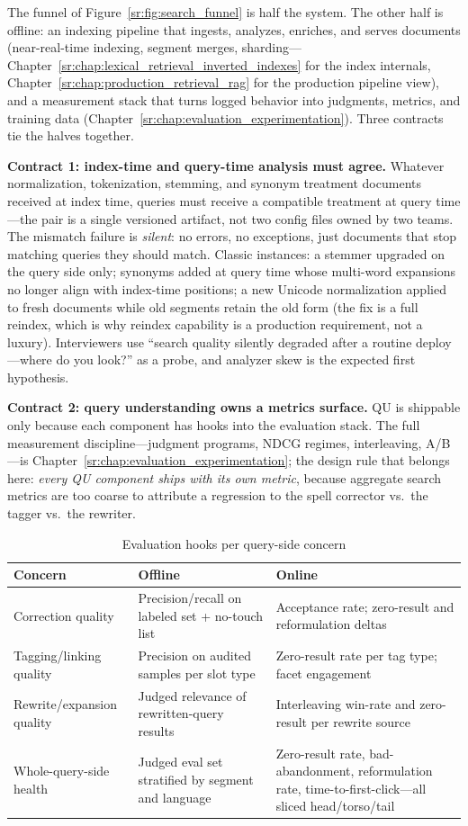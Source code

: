 The funnel of Figure~\ref{sr:fig:search_funnel} is half the system. The other half is offline: an indexing pipeline that ingests, analyzes, enriches, and serves documents (near-real-time indexing, segment merges, sharding---Chapter~\ref{sr:chap:lexical_retrieval_inverted_indexes} for the index internals, Chapter~\ref{sr:chap:production_retrieval_rag} for the production pipeline view), and a measurement stack that turns logged behavior into judgments, metrics, and training data (Chapter~\ref{sr:chap:evaluation_experimentation}). Three contracts tie the halves together.

\textbf{Contract 1: index-time and query-time analysis must agree.} Whatever normalization, tokenization, stemming, and synonym treatment documents received at index time, queries must receive a compatible treatment at query time---the pair is a single versioned artifact, not two config files owned by two teams. The mismatch failure is \textit{silent}: no errors, no exceptions, just documents that stop matching queries they should match. Classic instances: a stemmer upgraded on the query side only; synonyms added at query time whose multi-word expansions no longer align with index-time positions; a new Unicode normalization applied to fresh documents while old segments retain the old form (the fix is a full reindex, which is why reindex capability is a production requirement, not a luxury). Interviewers use ``search quality silently degraded after a routine deploy---where do you look?'' as a probe, and analyzer skew is the expected first hypothesis.

\textbf{Contract 2: query understanding owns a metrics surface.} QU is shippable only because each component has hooks into the evaluation stack. The full measurement discipline---judgment programs, NDCG regimes, interleaving, A/B---is Chapter~\ref{sr:chap:evaluation_experimentation}; the design rule that belongs here: \textit{every QU component ships with its own metric}, because aggregate search metrics are too coarse to attribute a regression to the spell corrector vs.\ the tagger vs.\ the rewriter.

\begin{table}[H]
\centering
\small
\caption{Evaluation hooks per query-side concern}
\label{sr:tab:qu_metrics}
\begin{tabularx}{\textwidth}{lXX}
\toprule
\textbf{Concern} & \textbf{Offline} & \textbf{Online} \\
\midrule
Correction quality & Precision/recall on labeled set + no-touch list & Acceptance rate; zero-result and reformulation deltas \\
Tagging/linking quality & Precision on audited samples per slot type & Zero-result rate per tag type; facet engagement \\
Rewrite/expansion quality & Judged relevance of rewritten-query results & Interleaving win-rate and zero-result per rewrite source \\
Whole-query-side health & Judged eval set stratified by segment and language & Zero-result rate, bad-abandonment, reformulation rate, time-to-first-click---all sliced head/torso/tail \\
\bottomrule
\end{tabularx}
\end{table}


